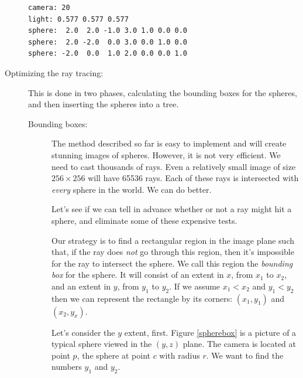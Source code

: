 \documentclass{article}
\begin{document}
\begin{description}
  \begin{Verbatim}[frame=single,label=myworld.wrl]
camera: 20
light: 0.577 0.577 0.577
sphere:  2.0  2.0 -1.0 3.0 1.0 0.0 0.0
sphere:  2.0 -2.0  0.0 3.0 0.0 1.0 0.0
sphere: -2.0  0.0  1.0 2.0 0.0 0.0 1.0
\end{Verbatim}

\item[Optimizing the ray tracing:]  This is done in two phases,
  calculating the bounding boxes for the spheres, and then inserting
  the spheres into a tree.

  \begin{description}
    \item[Bounding boxes:]
  The method described so far is easy to implement and will create
  stunning images of spheres.  However, it is not very efficient.  We
  need to cast thousands of rays.  Even a relatively small image of
  size $256\times256$ will have 65536 rays.  Each of these rays is
  intersected with {\em every} sphere in the world.  We can do better.

  Let's see if we can tell in advance whether or not a ray might hit a
  sphere, and eliminate some of these expensive tests.

Our strategy is to find a rectangular region in the image plane such
that, if the ray does {\em not} go through this region, then it's
impossible for the ray to intersect the sphere.  We call this region
the {\em bounding box} for the sphere.  It will consist of an extent
in $x$, from $x_1$ to $x_2$, and an extent in $y$, from $y_1$ to
$y_2$.  If we assume   $x_1 < x_2$ and $y_1 < y_2$ then we can
represent the rectangle by its corners: $(x_1,y_1)$ and $(x_2, y_x)$.  

Let's consider the $y$ extent, first.  Figure \ref{spherebox} is a
picture of a typical sphere viewed in the $(y,z)$ plane.  The camera is
located at point $p$, the sphere at point $c$ with radius $r$.  We
want to find the numbers $y_1$ and $y_2$.




\end{description}
\end{description}
\end{document}
